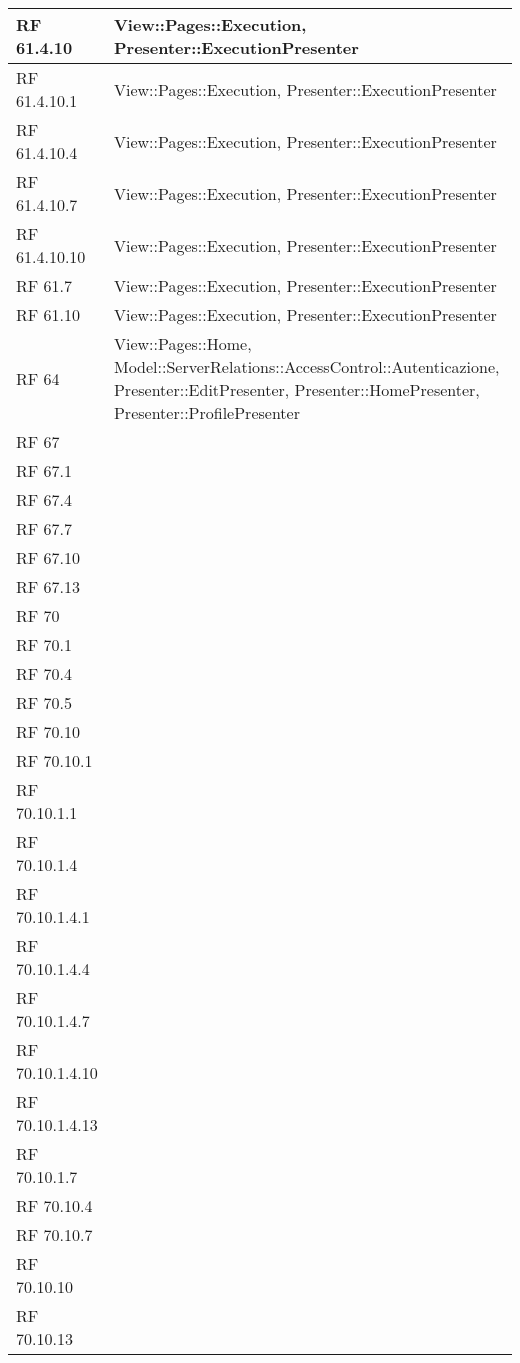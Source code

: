 {\begin{longtable} [c]{| p{2cm} | p{13cm} |}
 \hline 
RF 61.4.10 & View::Pages::Execution, Presenter::ExecutionPresenter\\ 
 \hline 
RF 61.4.10.1 & View::Pages::Execution, Presenter::ExecutionPresenter\\ 
 \hline 
RF 61.4.10.4 & View::Pages::Execution, Presenter::ExecutionPresenter\\ 
 \hline 
RF 61.4.10.7 & View::Pages::Execution, Presenter::ExecutionPresenter\\ 
 \hline 
RF 61.4.10.10 & View::Pages::Execution, Presenter::ExecutionPresenter\\ 
 \hline 
RF 61.7 & View::Pages::Execution, Presenter::ExecutionPresenter\\ 
 \hline 
RF 61.10 & View::Pages::Execution, Presenter::ExecutionPresenter\\ 
 \hline 
RF 64 & View::Pages::Home, Model::ServerRelations::AccessControl::Autenticazione, Presenter::EditPresenter, Presenter::HomePresenter, Presenter::ProfilePresenter\\ 
 \hline 
RF 67 & \\ 
 \hline 
RF 67.1 & \\ 
 \hline 
RF 67.4 & \\ 
 \hline 
RF 67.7 & \\ 
 \hline 
RF 67.10 & \\ 
 \hline 
RF 67.13 & \\ 
 \hline 
RF 70 & \\ 
 \hline 
RF 70.1 & \\ 
 \hline 
RF 70.4 & \\ 
 \hline 
RF 70.5 & \\ 
 \hline 
RF 70.10 & \\ 
 \hline 
RF 70.10.1 & \\ 
 \hline 
RF 70.10.1.1 & \\ 
 \hline 
RF 70.10.1.4 & \\ 
 \hline 
RF 70.10.1.4.1 & \\ 
 \hline 
RF 70.10.1.4.4 & \\ 
 \hline 
RF 70.10.1.4.7 & \\ 
 \hline 
RF 70.10.1.4.10 & \\ 
 \hline 
RF 70.10.1.4.13 & \\ 
 \hline 
RF 70.10.1.7 & \\ 
 \hline 
RF 70.10.4 & \\ 
 \hline 
RF 70.10.7 & \\ 
 \hline 
RF 70.10.10 & \\ 
 \hline 
RF 70.10.13 & \\ 

\end{longtable}}
